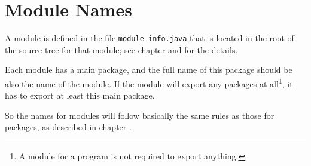 \section{Module Names}\label{sec:Modules}
A module is defined in the file \verb#module-info.java# that is located in the root of the source tree for that module; see chapter  and \autocite{ORACLE_DOC_LANGUAGE_SPECIFICATION:ModuleDeclarations} for the details.

Each module has a main package, and the full name of this package should be also the name of the module. If the module will export any packages at all\footnote{A module for a program is not required to export anything.}, it has to export at least this main package.

So the names for modules will follow basically the same rules as those for packages, as described in chapter .

